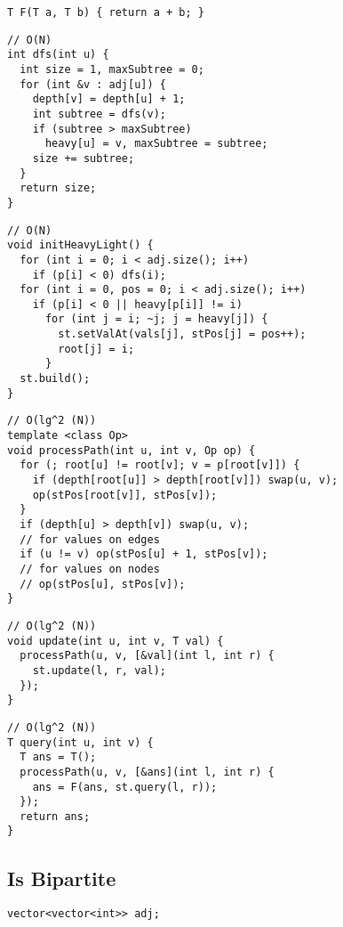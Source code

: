 \documentclass[twoside]{article}
\begin{document}
\begin{multicols*}{2}
\begin{verbatim}
T F(T a, T b) { return a + b; }
\end{verbatim}
\vspace{-12pt}
\begin{verbatim}
// O(N)
int dfs(int u) {
  int size = 1, maxSubtree = 0;
  for (int &v : adj[u]) {
    depth[v] = depth[u] + 1;
    int subtree = dfs(v);
    if (subtree > maxSubtree)
      heavy[u] = v, maxSubtree = subtree;
    size += subtree;
  }
  return size;
}
\end{verbatim}
\vspace{-12pt}
\begin{verbatim}
// O(N)
void initHeavyLight() {
  for (int i = 0; i < adj.size(); i++)
    if (p[i] < 0) dfs(i);
  for (int i = 0, pos = 0; i < adj.size(); i++)
    if (p[i] < 0 || heavy[p[i]] != i)
      for (int j = i; ~j; j = heavy[j]) {
        st.setValAt(vals[j], stPos[j] = pos++);
        root[j] = i;
      }
  st.build();
}
\end{verbatim}
\vspace{-12pt}
\begin{verbatim}
// O(lg^2 (N))
template <class Op>
void processPath(int u, int v, Op op) {
  for (; root[u] != root[v]; v = p[root[v]]) {
    if (depth[root[u]] > depth[root[v]]) swap(u, v);
    op(stPos[root[v]], stPos[v]);
  }
  if (depth[u] > depth[v]) swap(u, v);
  // for values on edges
  if (u != v) op(stPos[u] + 1, stPos[v]);
  // for values on nodes
  // op(stPos[u], stPos[v]);
}
\end{verbatim}
\vspace{-12pt}
\begin{verbatim}
// O(lg^2 (N))
void update(int u, int v, T val) {
  processPath(u, v, [&val](int l, int r) {
    st.update(l, r, val);
  });
}
\end{verbatim}
\vspace{-12pt}
\begin{verbatim}
// O(lg^2 (N))
T query(int u, int v) {
  T ans = T();
  processPath(u, v, [&ans](int l, int r) {
    ans = F(ans, st.query(l, r));
  });
  return ans;
}
\end{verbatim}

\subsectionfont{\large\bfseries\sffamily\underline}
\subsection*{Is Bipartite}
\begin{verbatim}
vector<vector<int>> adj;


\end{verbatim}
\end{multicols*}
\end{document}
